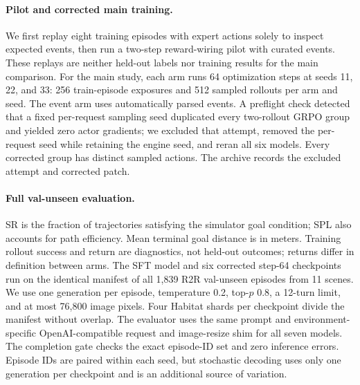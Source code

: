 \documentclass[10pt,twocolumn,letterpaper]{article}
\begin{document}
\paragraph{Pilot and corrected main training.} We first replay eight training episodes with expert actions solely to inspect expected events, then run a two-step reward-wiring pilot with curated events. These replays are neither held-out labels nor training results for the main comparison. For the main study, each arm runs 64 optimization steps at seeds 11, 22, and 33: 256 train-episode exposures and 512 sampled rollouts per arm and seed. The event arm uses automatically parsed events. A preflight check detected that a fixed per-request sampling seed duplicated every two-rollout GRPO group and yielded zero actor gradients; we excluded that attempt, removed the per-request seed while retaining the engine seed, and reran all six models. Every corrected group has distinct sampled actions. The archive records the excluded attempt and corrected patch.

\paragraph{Full val-unseen evaluation.} SR is the fraction of trajectories satisfying the simulator goal condition; SPL also accounts for path efficiency. Mean terminal goal distance is in meters. Training rollout success and return are diagnostics, not held-out outcomes; returns differ in definition between arms. The SFT model and six corrected step-64 checkpoints run on the identical manifest of all 1,839 R2R val-unseen episodes from 11 scenes. We use one generation per episode, temperature 0.2, top-$p$ 0.8, a 12-turn limit, and at most 76,800 image pixels. Four Habitat shards per checkpoint divide the manifest without overlap. The evaluator uses the same prompt and environment-specific OpenAI-compatible request and image-resize shim for all seven models. The completion gate checks the exact episode-ID set and zero inference errors. Episode IDs are paired within each seed, but stochastic decoding uses only one generation per checkpoint and is an additional source of variation.
\end{document}
